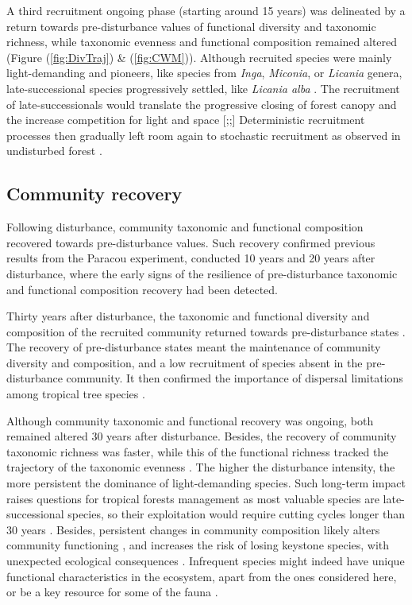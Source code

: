 \documentclass[fleqn,10pt]{ArtEcoFoG} %
\begin{document}
A third recruitment ongoing phase (starting around 15 years) was delineated by a return towards pre-disturbance values of functional diversity and taxonomic richness, while taxonomic evenness and functional composition remained altered (Figure (\ref{fig:DivTraj}) \& (\ref{fig:CWM})).
Although recruited species were mainly light-demanding and pioneers, like species from \emph{Inga}, \emph{Miconia}, or \emph{Licania} genera, late-successional species progressively settled, like \emph{Licania alba} \citep{Fortunel2014}.
The recruitment of late-successionals would translate the progressive closing of forest canopy and the increase competition for light and space {[}\citet{Peet1992};\citet{Denslow2000};{]}
Deterministic recruitment processes then gradually left room again to stochastic recruitment as observed in undisturbed forest \citep{Lawton1988, Chave2004}.

\hypertarget{community-recovery}{%
\subsection{Community recovery}\label{community-recovery}}

Following disturbance, community taxonomic and functional composition recovered towards pre-disturbance values.
Such recovery confirmed previous results from the Paracou experiment, conducted 10 years \citep{Molino2001} and 20 years \citep{Baraloto2012a} after disturbance, where the early signs of the resilience of pre-disturbance taxonomic and functional composition recovery had been detected.

Thirty years after disturbance, the taxonomic and functional diversity and composition of the recruited community returned towards pre-disturbance states \citep{Fukami2005, Fortunel2014}.
The recovery of pre-disturbance states meant the maintenance of community diversity and composition, and a low recruitment of species absent in the pre-disturbance community.
It then confirmed the importance of dispersal limitations among tropical tree species \citep{Svenning2005}.

Although community taxonomic and functional recovery was ongoing, both remained altered 30 years after disturbance.
Besides, the recovery of community taxonomic richness was faster, while this of the functional richness tracked the trajectory of the taxonomic evenness \citep{Grime1998}.
The higher the disturbance intensity, the more persistent the dominance of light-demanding species.
Such long-term impact raises questions for tropical forests management as most valuable species are late-successional species, so their exploitation would require cutting cycles longer than 30 years \citep{Putz2012}.
Besides, persistent changes in community composition likely alters community functioning \citep{Diaz2005}, and increases the risk of losing keystone species, with unexpected ecological consequences \citep{Jones1994, Chazdon2003a}.
Infrequent species might indeed have unique functional characteristics in the ecosystem, apart from the ones considered here, or be a key resource for some of the fauna \citep{Schleuning2016}.
\end{document}
